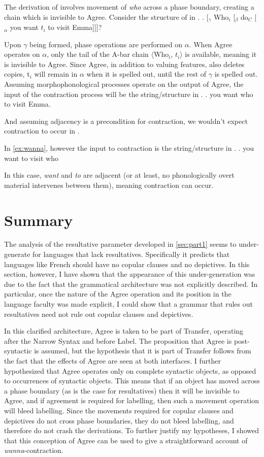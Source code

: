 \documentclass[MilwayThesis]{subfiles}
\begin{document}
The derivation of \Last[b] involves movement of \textit{who} across a phase boundary, creating a chain which is invisible to Agree.
Consider the structure of \Last[b] in \Next.
\ex. \label{fig:star-wanna-tree}
[$_\gamma$ Who$_i$ [$_\beta$ do$_C$ [$_\alpha$ you want $t_i$ to visit Emma]]]?

Upon $\gamma$ being formed, phase operations are performed on $\alpha$.
When Agree operates on $\alpha$, only the tail of the A-bar chain $\langle$Who$_i$, $t_i\rangle$ is available, meaning it is invisible to Agree.
Since Agree, in addition to valuing features, also deletes copies, t$_i$ will remain in $\alpha$ when it is spelled out, until the rest of $\gamma$ is spelled out.
Assuming morphophonological processes operate on the output of Agree, the input of the contraction process will be the string/structure in \Next.
\ex. you want who to visit Emma.

And assuming adjacency is a precondition for contraction, we wouldn't expect contraction to occur in \Last.

In \ref{ex:wanna}, however the input to contraction is the string/structure in \Next.
\ex. you want to visit who

In this case, \textit{want} and \textit{to} are adjacent (or at least, no phonologically overt material intervenes between them), meaning contraction can occur.

\section{Summary}
The analysis of the resultative parameter developed in \cref{sec:part1} seems to under-generate for languages that lack resultatives.
Specifically it predicts that languages like French should have no copular clauses and no depictives.
In this section, however, I have shown that the appearance of this under-generation was due to the fact that the grammatical architecture was not explicitly described.
In particular, once the nature of the Agree operation and its position in the language faculty was made explicit, I could show that a grammar that rules out resultatives need not rule out copular clauses and depictives.

In this clarified architecture, Agree is taken to be part of Transfer, operating after the Narrow Syntax and before Label.
The proposition that Agree is post-syntactic is assumed, but the hypothesis that it is part of Transfer follows from the fact that the effects of Agree are seen at both interfaces.
I further hypothesized that Agree operates only on complete syntactic objects, as opposed to occurrences of syntactic objects.
This means that if an object has moved across a phase boundary (as is the case for resultatives) then it will be invisible to Agree, and if agreement is required for labelling, then such a movement operation will bleed labelling.
Since the movements required for copular clauses and depictives do not cross phase boundaries, they do not bleed labelling, and therefore do not crash the derivations.
To further justify my hypotheses, I showed that this conception of Agree can be used to give a straightforward account of \textit{wanna}-contraction.
\end{document}
